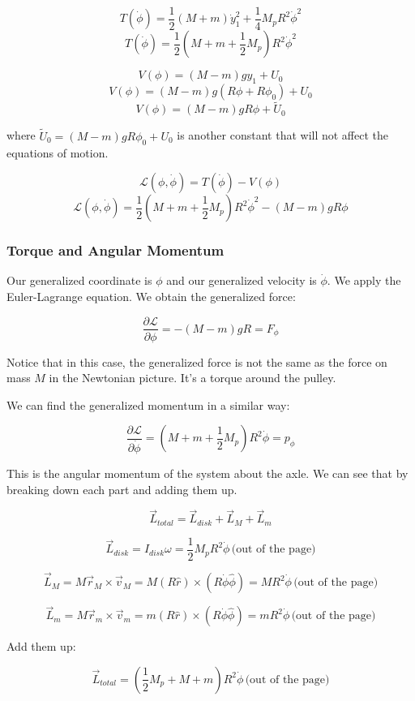\documentclass[11pt]{article}
\begin{document}
\[T(\dot{\phi}) = \dfrac{1}{2}(M+m)\dot{y}_1^2 + \dfrac{1}{4}M_p R^2 \dot{\phi}^2\]
\[T(\dot{\phi}) = \dfrac{1}{2}(M+m+\frac{1}{2}M_p)R^2 \dot{\phi}^2\]

\[V(\phi) = (M-m)gy_1 + U_0\]
\[V(\phi) = (M-m)g(R\phi + R\phi_0) + U_0\]
\[V(\phi) = (M-m)gR\phi + \tilde{U}_0\]

where \(\tilde{U}_0 = (M-m)gR\phi_0 + U_0\) is another constant that
will not affect the equations of motion.

\[\mathcal{L}(\phi, \dot{\phi}) = T(\dot{\phi}) - V(\phi)\]
\[\mathcal{L}(\phi, \dot{\phi}) = \dfrac{1}{2}(M+m+\frac{1}{2}M_p)R^2 \dot{\phi}^2 - (M-m)gR\phi\]

\subsubsection{Torque and Angular
Momentum}\label{torque-and-angular-momentum}

Our generalized coordinate is \(\phi\) and our generalized velocity is
\(\dot{\phi}\). We apply the Euler-Lagrange equation. We obtain the
generalized force:

\[\dfrac{\partial \mathcal{L}}{\partial \phi} = -(M-m)gR = F_{\phi}\]

Notice that in this case, the generalized force is not the same as the
force on mass \(M\) in the Newtonian picture. It's a torque around the
pulley.

We can find the generalized momentum in a similar way:

\[\dfrac{\partial \mathcal{L}}{\partial \dot{\phi}} = (M+m+\frac{1}{2}M_p)R^2\dot{\phi} = p_{\phi}\]

This is the angular momentum of the system about the axle. We can see
that by breaking down each part and adding them up.

\[\vec{L}_{total} = \vec{L}_{disk} + \vec{L}_{M} + \vec{L}_{m}\]

\[\vec{L}_{disk} = I_{disk}\omega = \dfrac{1}{2}M_p R^2 \dot{\phi}\,\text{(out of the page)}\]

\[\vec{L}_{M} = M\vec{r}_{M}\times \vec{v}_{M} = M(R\hat{r})\times (R\dot{\phi}\hat{\phi}) = MR^2 \dot{\phi}\,\text{(out of the page)}\]

\[\vec{L}_{m} = M\vec{r}_{m}\times \vec{v}_{m} = m(R\hat{r})\times (R\dot{\phi}\hat{\phi}) = mR^2 \dot{\phi}\,\text{(out of the page)}\]

Add them up:

\[\vec{L}_{total} = \left(\dfrac{1}{2}M_p + M + m\right)R^2 \dot{\phi}\,\text{(out of the page)}\]
\end{document}
